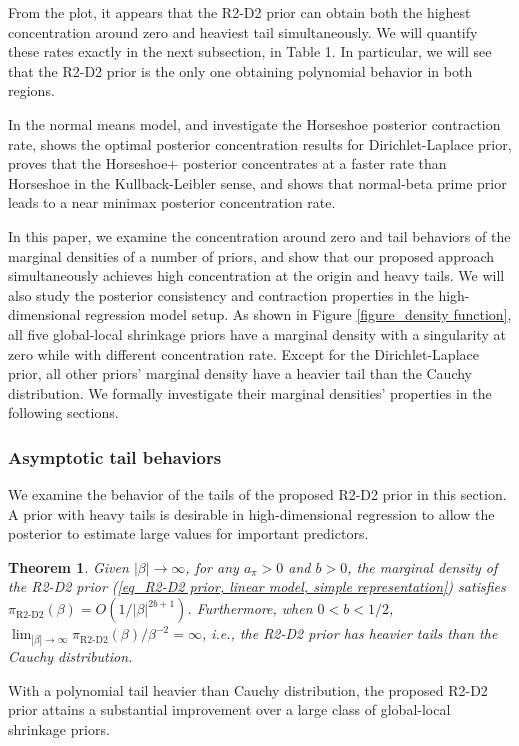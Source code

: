 \documentclass[12pt]{article}
\newtheorem{theorem}{Theorem}
\begin{document}
From the plot, it appears that the R2-D2 prior can obtain both the highest concentration around zero and heaviest tail simultaneously. We will quantify these rates exactly in the next subsection, in Table 1. In particular, we will see that the R2-D2 prior is the only one obtaining polynomial behavior in both regions.

In the normal means model,  \cite{van2014horseshoe} and \cite{van2017adaptive} investigate the  Horseshoe  posterior contraction rate,   \cite{bhattacharya2015dirichlet} shows the optimal  posterior concentration results for Dirichlet-Laplace prior, \cite{bhadra2016horseshoe+} proves that the Horseshoe+ posterior concentrates at a faster rate than Horseshoe in the Kullback-Leibler sense, and \cite{bai2019large} shows that normal-beta prime prior leads to a near minimax posterior concentration rate.

In this paper, we examine the concentration around zero and tail behaviors of the marginal densities of a number of priors, and show that our proposed approach simultaneously achieves high concentration at the origin and heavy tails. We will also study the posterior consistency and contraction properties  in the high-dimensional regression model setup. As shown in  Figure \ref{figure_density function},   all five global-local shrinkage priors have a marginal density with a singularity at zero while with different concentration rate.  Except for the Dirichlet-Laplace prior, all other priors' marginal density have a heavier tail than the Cauchy distribution. We formally investigate their marginal densities' properties in the following sections.







\subsubsection{Asymptotic tail  behaviors}\label{Section_tail properties}
We  examine the behavior of the tails of the proposed   R2-D2 prior in this section.  A prior with heavy tails is desirable in high-dimensional regression to allow the posterior to estimate  large values   for important predictors.
\begin{theorem}\label{theorem_tail properties}
	Given  $|\beta|\rightarrow\infty$, for any  $a_\pi>0$ and $b>0$, the marginal density of the  R2-D2 prior  (\ref{eq_R2-D2 prior, linear model, simple representation})
	satisfies
	$\pi_{\text{R2-D2}}(\beta) = O({1}/{|\beta|^{2b+1} }) $.
	Furthermore,  when $0<b<1/2$, $\lim_{|\beta|\rightarrow\infty} {\pi_{\text{R2-D2}}(\beta)}/\beta^{-2} = \infty $, i.e., the  R2-D2 prior has heavier tails than the Cauchy distribution.
\end{theorem}
With a polynomial tail heavier than Cauchy distribution, the proposed R2-D2  prior attains a substantial improvement over a large class of global-local shrinkage priors.
\end{document}
